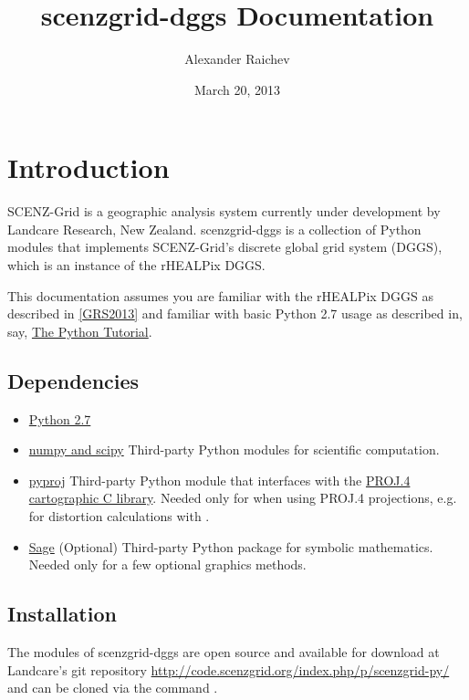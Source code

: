 \documentclass[a4paper,12ptopenany,oneside]{sphinxmanual}
\title{scenzgrid-dggs Documentation}
\date{March 20, 2013}
\author{Alexander Raichev}
\begin{document}
\maketitle
\tableofcontents
{}\label{index::doc}



\chapter{Introduction}
\label{introduction:introduction}\label{introduction:welcome-to-scenzgrid-dggs-s-documentation}\label{introduction::doc}
SCENZ-Grid is a geographic analysis system currently under development by Landcare Research, New Zealand.
scenzgrid-dggs is a collection of Python modules that implements SCENZ-Grid's discrete global grid system (DGGS), which is an instance of the rHEALPix DGGS.

This documentation assumes you are familiar with the rHEALPix DGGS as described in {\hyperref[introduction:grs2013]{{[}GRS2013{]}}} and familiar with basic Python 2.7 usage as described in, say, \href{http://docs.python.org/2/tutorial/}{The Python Tutorial}.


\section{Dependencies}
\label{introduction:dependencies}\begin{itemize}
\item {} 
\href{http://python.org/}{Python 2.7}

\item {} 
\href{http://www.scipy.org/}{numpy and scipy}
Third-party Python modules for scientific computation.

\item {} 
\href{http://code.google.com/p/pyproj/}{pyproj}
Third-party Python module that interfaces with the \href{http://trac.osgeo.org/proj/}{PROJ.4 cartographic C library}.
Needed only for when using PROJ.4 projections, e.g. for distortion calculations with .

\item {} 
\href{http://www.sagemath.org}{Sage}
(Optional) Third-party Python package for symbolic mathematics.
Needed only for a few optional graphics methods.

\end{itemize}


\section{Installation}
\label{introduction:installation}
The modules of scenzgrid-dggs are open source and available for download at Landcare's git repository \href{http://code.scenzgrid.org/index.php/p/scenzgrid-py/}{http://code.scenzgrid.org/index.php/p/scenzgrid-py/} and can be cloned via the command .
\end{document}
